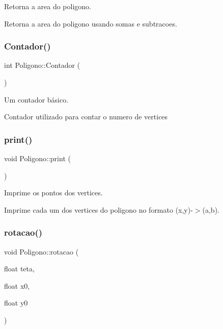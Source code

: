 Retorna a area do poligono. 

Retorna a area do poligono usando somas e subtracoes. \mbox{\label{class_poligono_a345539e8cc714d4e429c92fbfbb825d6}} 
\subsubsection{\texorpdfstring{Contador()}{Contador()}}
{\footnotesize\ttfamily int Poligono\+::\+Contador (\begin{DoxyParamCaption}{ }\end{DoxyParamCaption})}



Um contador básico. 

Contador utilizado para contar o numero de vertices \mbox{\label{class_poligono_ac22d76a087d08ea82627be416404ae15}} 
\subsubsection{\texorpdfstring{print()}{print()}}
{\footnotesize\ttfamily void Poligono\+::print (\begin{DoxyParamCaption}{ }\end{DoxyParamCaption})}



Imprime os pontos dos vertices. 

Imprime cada um dos vertices do poligono no formato (x,y)-\/$>$(a,b). \mbox{\label{class_poligono_a487911a74fc40ea3cdea61380889e180}} 
\subsubsection{\texorpdfstring{rotacao()}{rotacao()}}
{\footnotesize\ttfamily void Poligono\+::rotacao (\begin{DoxyParamCaption}\item[{float}]{teta,  }\item[{float}]{x0,  }\item[{float}]{y0 }\end{DoxyParamCaption})}



